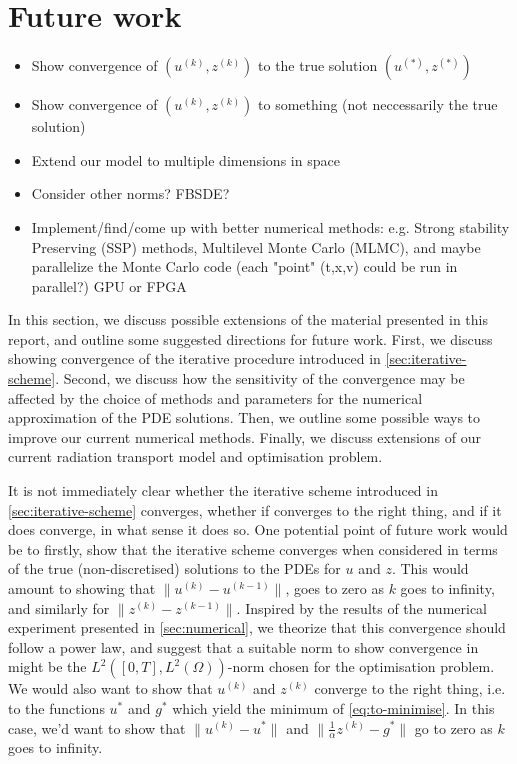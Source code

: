 \section{Future work}
\begin{itemize}
    \item Show convergence of $(u^{(k)},z^{(k)})$ to the true solution $(u^{(*)},z^{(*)})$
    \item Show convergence of $(u^{(k)},z^{(k)})$ to something (not neccessarily the true solution)
    \item Extend our model to multiple dimensions in space
    \item Consider other norms? FBSDE? 
    \item Implement/find/come up with better numerical methods: e.g. Strong stability Preserving (SSP) methods, Multilevel Monte Carlo (MLMC), and maybe parallelize the Monte Carlo code (each "point" (t,x,v) could be run in parallel?) GPU or FPGA
\end{itemize}

In this section, we discuss possible extensions of the material presented in this report, and outline some suggested directions for future work. First, we discuss showing convergence of the iterative procedure introduced in \autoref{sec:iterative-scheme}. Second, we discuss how the sensitivity of the convergence may be affected by the choice of methods and parameters for the numerical approximation of the PDE solutions. Then, we outline some possible ways to improve our current numerical methods. Finally, we discuss extensions of our current radiation transport model and optimisation problem.

It is not immediately clear whether the iterative scheme introduced in \autoref{sec:iterative-scheme} converges, whether if converges to the right thing, and if it does converge, in what sense it does so. One potential point of future work would be to firstly, show that the iterative scheme converges when considered in terms of the true (non-discretised) solutions to the PDEs for $u$ and $z$. This would amount to showing that $\lVert u^{(k)} - u^{(k-1)} \rVert$, goes to zero as $k$ goes to infinity, and similarly for $\lVert z^{(k)} - z^{(k-1)} \rVert$. Inspired by the results of the numerical experiment presented in \autoref{sec:numerical}, we theorize that this convergence should follow a power law, and suggest that a suitable norm to show convergence in might be the $L^2([0,T],L^2(\Omega))$-norm chosen for the optimisation problem. We would also want to show that $u^{(k)}$ and $z^{(k)}$ converge to the right thing, i.e. to the functions $u^{*}$ and $g^{*}$ which yield the minimum of \autoref{eq:to-minimise}. In this case, we'd want to show that $\lVert u^{(k)} - u^{*} \rVert$ and $\lVert \frac{1}{\alpha}z^{(k)} - g^{*} \rVert$ go to zero as $k$ goes to infinity.

